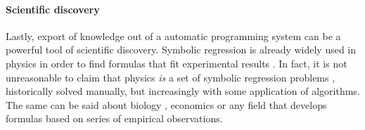 \paragraph{Scientific discovery}

Lastly, export of knowledge out of a automatic programming system can be a powerful tool of scientific discovery. 
Symbolic regression is already widely used in physics in order to find formulas that fit experimental results \cite{angelisArtificialIntelligencePhysical2023, tenachiDeepSymbolicRegression2023}. 
In fact, it is not unreasonable to claim that physics \emph{is} a set of symbolic regression problems \cite{udrescuAIFeynmanPhysicsinspired2020}, historically solved manually, but increasingly with some application of algorithms. 
The same can be said about biology \cite{chenRevealingComplexEcological2019}, economics \cite{claveriaAssessmentEffectFinancial2017, lianModelingForecastingPassenger2018, panInfluentialFactorsCarbon2019, truscottDetectingShadowEconomy2011, truscottExplainingUnemploymentRates2014, yamashitaCustomizedPredictionAttendance2022} or any field that develops formulas based on series of empirical observations.
